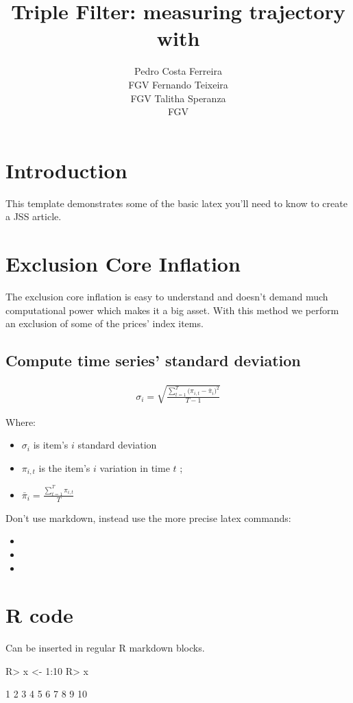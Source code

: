 \documentclass[article]{jss}
\author{
Pedro Costa Ferreira\\FGV \And Fernando Teixeira\\FGV \And Talitha Speranza\\FGV
}
\title{Triple Filter: measuring trajectory with \pkg{INFLATION}}
\providecommand{\tightlist}{%
  \setlength{\itemsep}{0pt}\setlength{\parskip}{0pt}}
\begin{document}
\section{Introduction}\label{introduction}

This template demonstrates some of the basic latex you'll need to know
to create a JSS article. \citep{quah1995measuring}

\section{Exclusion Core Inflation}\label{exclusion-core-inflation}

The exclusion core inflation is easy to understand and doesn't demand
much computational power which makes it a big asset. With this method we
perform an exclusion of some of the prices' index items.

\subsection{Compute time series' standard
deviation}\label{compute-time-series-standard-deviation}

\begin{align}
\sigma_{i} = \sqrt{\frac{\sum\nolimits_{t=1}^{T}{(\pi_{i,t}-\bar{\pi}_{i}})^2}{T-1}}
\end{align}

Where:

\begin{itemize}
\tightlist
\item
  \(\sigma_i\) is item's \(i\) standard deviation
\item
  \(\pi_{i,t}\) is the item's \(i\) variation in time \(t\) ;
\item
  \(\bar{\pi}_{i} = \frac{\sum_{t=1}^{T}{\pi_{i,t}}}{T}\)
\end{itemize}

Don't use markdown, instead use the more precise latex commands:

\begin{itemize}
\tightlist
\item
\item
\item
\end{itemize}

\section{R code}\label{r-code}

Can be inserted in regular R markdown blocks.

\begin{CodeChunk}

\begin{CodeInput}
R> x <- 1:10
R> x
\end{CodeInput}

\begin{CodeOutput}
 [1]  1  2  3  4  5  6  7  8  9 10
\end{CodeOutput}
\end{CodeChunk}


\end{document}
